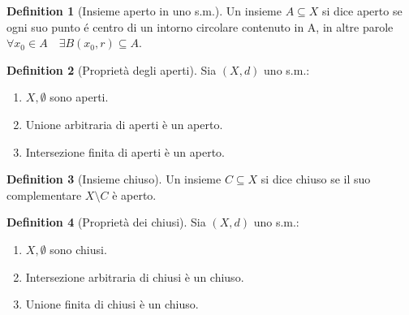 \documentclass[leqno]{article}
\theoremstyle{definition}
\newtheorem{definition}{Definition}[section]
\numberwithin{equation}{section}
\theoremstyle{remark}
\begin{document}
	
	\begin{definition}[Insieme aperto in uno s.m.]
		Un insieme $A\subseteq X$ si dice aperto se ogni suo punto é centro di un intorno circolare contenuto in A, in altre parole $\forall x_0 \in A \quad \exists B(x_0,r)\subseteq A$. 
	\end{definition}
	
	\begin{definition}[Proprietà degli aperti]
		Sia $(X,d)$ uno s.m.:
		\begin{enumerate}
			\item $X,\emptyset$ sono aperti.
			\item Unione arbitraria di aperti è un aperto.
			\item Intersezione finita di aperti è un aperto.
		\end{enumerate}
		
	\end{definition}
	\begin{definition}[Insieme chiuso]
		Un insieme $C \subseteq X$ si dice chiuso se il suo complementare $X \setminus C$ è aperto.
	\end{definition}
	
	\begin{definition}[Proprietà dei chiusi]
		Sia $(X,d)$ uno s.m.:
		\begin{enumerate}
			\item $X,\emptyset$ sono chiusi.
			\item Intersezione arbitraria di chiusi è un chiuso.
			\item Unione finita di chiusi è un chiuso.
		\end{enumerate}
	\end{definition}
	
\end{document}
